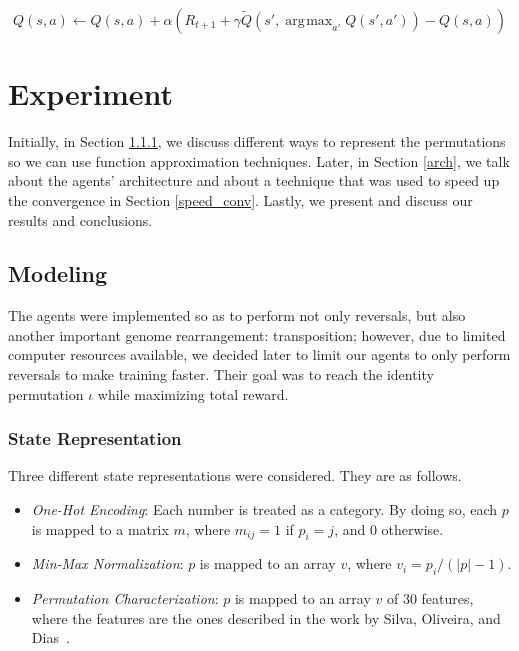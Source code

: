 \documentclass[11pt,twoside]{article}
\DeclareMathOperator*{\argmax}{\arg\!\max}
\begin{document}
\begin{equation}\label{double_equation}
	Q(s, a) \leftarrow Q(s, a) + \alpha (R_{t+1} + \gamma \widetilde{Q}(s', \argmax_{a'}{Q(s', a')}) - Q(s,a))
\end{equation}

\section{Experiment}\label{section:expr}

Initially, in Section \ref{state_rep}, we discuss different ways to represent the permutations so we can use function approximation techniques. Later, in Section \ref{arch}, we talk about the agents' architecture and about a technique that was used to speed up the convergence in Section \ref{speed_conv}. Lastly, we present and discuss our results and conclusions.

\subsection{Modeling}

The agents were implemented so as to perform not only reversals, but also another important genome rearrangement: transposition; however, due to limited computer resources available, we decided later to limit our agents to only perform reversals to make training faster. Their goal was to reach the identity permutation $\iota$ while maximizing total reward. 

\subsubsection{State Representation}\label{state_rep}

Three different state representations were considered. They are as follows.

\begin{itemize}
	\item \textit{One-Hot Encoding}: Each number is treated as a category. By doing so, each $p$ is mapped to a matrix $m$, where $m_{ij} = 1$ if $p_i = j$, and $0$ otherwise. 
	\item \textit{Min-Max Normalization}: $p$ is mapped to an array $v$, where $v_i = p_i / (|p| - 1)$.
	\item \textit{Permutation Characterization}: $p$ is mapped to an array $v$ of $30$ features, where the features are the ones described in the work by Silva, Oliveira, and Dias~\cite{flavio}.
\end{itemize}
\end{document}
